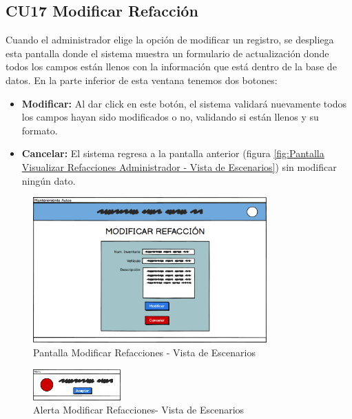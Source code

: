 \subsection{CU17 Modificar Refacción}
Cuando el administrador elige la opción de modificar un registro, se despliega esta pantalla donde el sistema muestra un formulario de actualización donde todos los campos están llenos con la información que está dentro de la base de datos. En la parte inferior de esta ventana tenemos dos botones:
\begin{itemize}
	\item \textbf{Modificar:} Al dar click en este botón, el sistema validará nuevamente todos los campos hayan sido modificados o no, validando si están llenos y su formato. 
	\item \textbf{Cancelar:} El sistema regresa a la pantalla anterior (figura \ref{fig:Pantalla Visualizar Refacciones Administrador - Vista de Escenarios}) sin modificar ningún dato. 
\end{itemize}
\begin{figure}[!h]
	\centering
	\includegraphics[width=0.8\textwidth]{./diseno/vescenarios/imagenes/modificarRefaccion}
	\caption{Pantalla Modificar Refacciones  - Vista de Escenarios}
	\label{fig:Pantalla Modificar Refacción - Vista de Escenarios}
\end{figure}
\begin{figure}[!h]
	\centering
	\includegraphics[width=0.3\textwidth]{./diseno/vescenarios/imagenes/alerta}
	\caption{Alerta Modificar Refacciones- Vista de Escenarios}
	\label{fig:Alerta Registro Refacciones - Vista de Escenarios}
\end{figure}
\clearpage